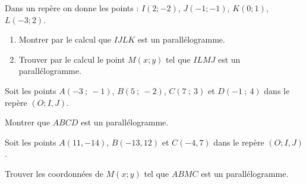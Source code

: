 \documentclass[main.tex]{subfiles}
\begin{document}
\begin{example}[je fais]\hfill
	
	Dans un repère on donne les points : $I(2 ; -2)$, $J(-1 ; -1)$, $K(0 ; 1)$, $L(-3 ; 2)$. 
	\begin{enumerate}[leftmargin=*,label=\alph*)] 
		\item Montrer par le calcul que $IJLK$ est un parallélogramme.
		\vfill 
		\item Trouver par le calcul le point $M(x;y)$ tel que $ILMJ$ est un parallélogramme.
		\vfill 
	\end{enumerate} 
\end{example}

\begin{exercise} \label{chapter06:exercices:parallelogrammes01}
	Soit les points $A(-3~;~-1)$, $B(5~;~-2)$, $C(7~;~3)$ et $D(-1~;~4)$ dans le repère $(O;I,J)$. 
	
	Montrer que  $ABCD$  est un parallélogramme.
\end{exercise}

\begin{exercise} \label{chapter06:exercices:parallelogrammes02}
	Soit les points $A(11,-14)$, $B(-13,12)$ et $C(-4,7)$ dans le repère $(O;I,J)$.
	
	Trouver les coordonnées de $M(x;y)$ tel que $ABMC$ est un parallélogramme.
\end{exercise}
%	 
\end{document}

